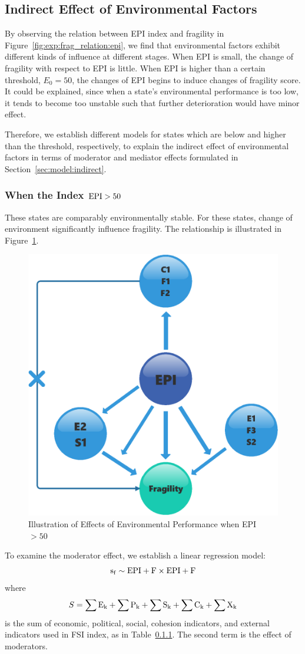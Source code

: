 \subsection{Indirect Effect of Environmental Factors}
\label{sec:exp:indirect}
By observing the relation between EPI index and fragility in Figure~\ref{fig:exp:frag_relation:epi}, we find that environmental factors exhibit different kinds of influence at different stages. 
When EPI is small, the change of fragility with respect to EPI is little. When EPI is higher than a certain threshold, $E_0=50$, the changes of EPI begins to induce changes of fragility score. It could be explained, since when a state's environmental performance is too low, it tends to become too unstable such that further deterioration would have minor effect.  

Therefore, we establish different models for states which are below and higher than the threshold, respectively, to explain the indirect effect of environmental factors in terms of moderator and mediator effects formulated in Section~\ref{sec:model:indirect}.

\subsubsection{When the Index $\rm{EPI} > 50$}
These states are comparably environmentally stable. For these states, change of environment significantly influence fragility. The relationship is illustrated in Figure~\ref{fig:exp:indirect:case2}.
\begin{figure}[tbp]
    \centering
   \includegraphics[width=.4\linewidth]{figs/larger50.eps} 
   \caption{Illustration of Effects of Environmental Performance when EPI $> 50$}
   \label{fig:exp:indirect:case2}
\end{figure}

To examine the moderator effect, we establish a linear regression model:
\begin{equation}
    \operatorname*{s_f} \sim \rm{EPI} + F \times\rm{EPI}+ F
    \label{eqn:indirect:moderator:reg} 
\end{equation}
where
\begin{equation}
   S= \sum\rm{E}_k + \sum\rm{P}_k + \sum\rm{S}_k + \sum\rm{C}_k + \sum\rm{X}_k
\end{equation}
is the sum of economic, political, social, cohesion indicators, and external indicators used in FSI index, as in Table~\ref{}. 
The second term is the effect of moderators. 


